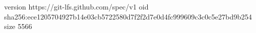 version https://git-lfs.github.com/spec/v1
oid sha256:ece1205704927b14e03cb5722580d7f2f2d7e0d4fc999609c3c0c5e27bd9b254
size 5566
